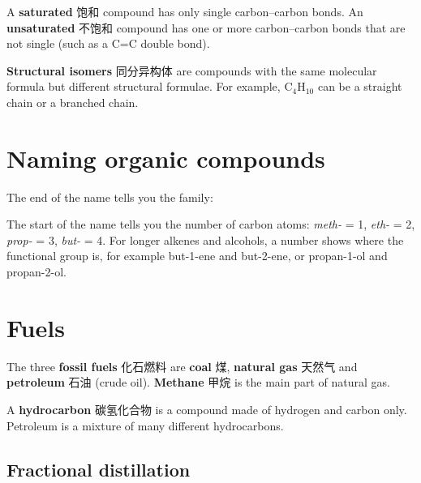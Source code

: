 \documentclass[11pt]{article}
\begin{document}
A \textbf{saturated} 饱和 compound has only single carbon–carbon bonds. An \textbf{unsaturated} 不饱和 compound has one or more carbon–carbon bonds that are not single (such as a C=C double bond).

\textbf{Structural isomers} 同分异构体 are compounds with the same molecular formula but different structural formulae. For example, $\text{C}_4\text{H}_{10}$ can be a straight chain or a branched chain.

\section*{Naming organic compounds}

The end of the name tells you the family:

\begin{center}
\end{center}

The start of the name tells you the number of carbon atoms: \emph{meth-} = 1, \emph{eth-} = 2, \emph{prop-} = 3, \emph{but-} = 4. For longer alkenes and alcohols, a number shows where the functional group is, for example but-1-ene and but-2-ene, or propan-1-ol and propan-2-ol.

\section*{Fuels}

The three \textbf{fossil fuels} 化石燃料 are \textbf{coal} 煤, \textbf{natural gas} 天然气 and \textbf{petroleum} 石油 (crude oil). \textbf{Methane} 甲烷 is the main part of natural gas.

A \textbf{hydrocarbon} 碳氢化合物 is a compound made of hydrogen and carbon only. Petroleum is a mixture of many different hydrocarbons.

\subsection*{Fractional distillation}
\end{document}

